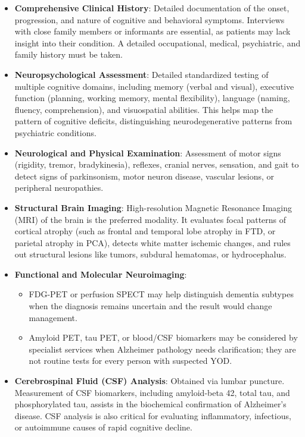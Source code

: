 \begin{itemize}
    \item \textbf{Comprehensive Clinical History}: Detailed documentation of the onset, progression, and nature of cognitive and behavioral symptoms. Interviews with close family members or informants are essential, as patients may lack insight into their condition. A detailed occupational, medical, psychiatric, and family history must be taken.
    \item \textbf{Neuropsychological Assessment}: Detailed standardized testing of multiple cognitive domains, including memory (verbal and visual), executive function (planning, working memory, mental flexibility), language (naming, fluency, comprehension), and visuospatial abilities. This helps map the pattern of cognitive deficits, distinguishing neurodegenerative patterns from psychiatric conditions.
    \item \textbf{Neurological and Physical Examination}: Assessment of motor signs (rigidity, tremor, bradykinesia), reflexes, cranial nerves, sensation, and gait to detect signs of parkinsonism, motor neuron disease, vascular lesions, or peripheral neuropathies.
    \item \textbf{Structural Brain Imaging}: High-resolution Magnetic Resonance Imaging (MRI) of the brain is the preferred modality. It evaluates focal patterns of cortical atrophy (such as frontal and temporal lobe atrophy in FTD, or parietal atrophy in PCA), detects white matter ischemic changes, and rules out structural lesions like tumors, subdural hematomas, or hydrocephalus.
    \item \textbf{Functional and Molecular Neuroimaging}:
    \begin{itemize}
        \item FDG-PET or perfusion SPECT may help distinguish dementia subtypes when the diagnosis remains uncertain and the result would change management.
        \item Amyloid PET, tau PET, or blood/CSF biomarkers may be considered by specialist services when Alzheimer pathology needs clarification; they are not routine tests for every person with suspected YOD.
    \end{itemize}
    \item \textbf{Cerebrospinal Fluid (CSF) Analysis}: Obtained via lumbar puncture. Measurement of CSF biomarkers, including amyloid-beta 42, total tau, and phosphorylated tau, assists in the biochemical confirmation of Alzheimer's disease. CSF analysis is also critical for evaluating inflammatory, infectious, or autoimmune causes of rapid cognitive decline.

\end{itemize}
